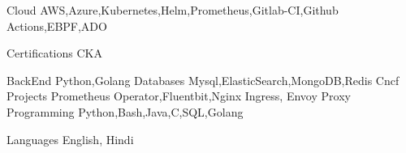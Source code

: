 

\begin{cvskills}

  \cvskill
    {Cloud} %
	{AWS,Azure,Kubernetes,Helm,Prometheus,Gitlab-CI,Github Actions,EBPF,ADO} %

  \cvskill
    {Certifications} %
	{CKA} %

  \cvskill
   {BackEnd} %
	{Python,Golang} %
  \cvskill
   {Databases} %
	{Mysql,ElasticSearch,MongoDB,Redis} %
\cvskill
{Cncf Projects} %
{Prometheus Operator,Fluentbit,Nginx Ingress, Envoy Proxy} %
  \cvskill
   {Programming} %
	{Python,Bash,Java,C,SQL,Golang} %

  \cvskill
    {Languages} %
	{English, Hindi} %

\end{cvskills}
